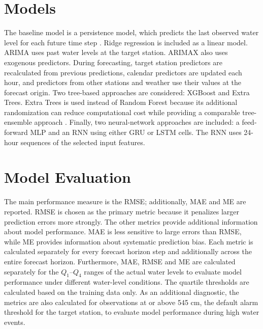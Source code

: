 

\section{Models}
The baseline model is a persistence model, which predicts the last observed water level for each future time step \cite{hyndmanAnotherLookMeasures2006, makridakisM4Competition1000002020}. Ridge regression is included as a linear model. \ac{ARIMA} uses past water levels at the target station. \ac{ARIMAX} also uses exogenous predictors. During forecasting, target station predictors are recalculated from previous predictions, calendar predictors are updated each hour, and predictors from other stations and weather use their values at the forecast origin. Two tree-based approaches are considered: XGBoost and Extra Trees. Extra Trees is used instead of Random Forest because its additional randomization can reduce computational cost while providing a comparable tree-ensemble approach \cite{geurtsExtremelyRandomizedTrees2006}. Finally, two neural-network approaches are included: a feed-forward \ac{MLP} and an \ac{RNN} using either \ac{GRU} or \ac{LSTM} cells. The \ac{RNN} uses 24-hour sequences of the selected input features.

\section{Model Evaluation}
The main performance measure is the \ac{RMSE}; additionally, \ac{MAE} and \ac{ME} are reported. \ac{RMSE} is chosen as the primary metric because it penalizes larger prediction errors more strongly. The other metrics provide additional information about model performance. \ac{MAE} is less sensitive to large errors than \ac{RMSE}, while \ac{ME} provides information about systematic prediction bias. Each metric is calculated separately for every forecast horizon step and additionally across the entire forecast horizon. Furthermore, \ac{MAE}, \ac{RMSE} and \ac{ME} are calculated separately for the $Q_1$--$Q_4$ ranges of the actual water levels to evaluate model performance under different water-level conditions. The quartile thresholds are calculated based on the training data only. As an additional diagnostic, the metrics are also calculated for observations at or above 545 cm, the default alarm threshold for the target station, to evaluate model performance during high water events.
